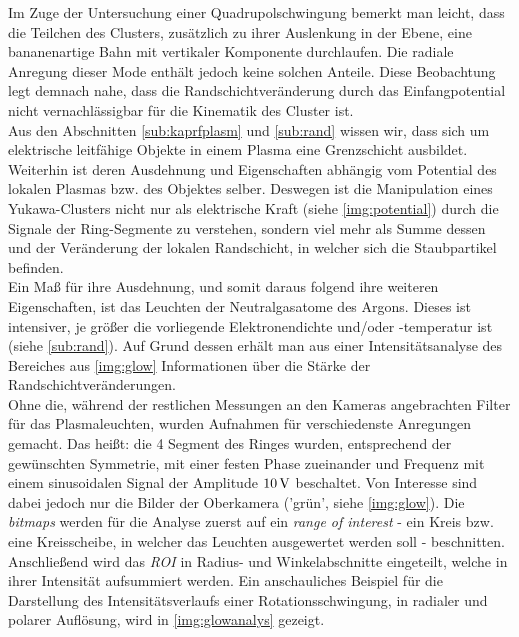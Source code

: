 \documentclass[numbers=noenddot,a4paper]{scrartcl}
\newcommand{\tilt}[1]{\textit{#1}}
\begin{document}
		Im Zuge der Untersuchung einer Quadrupolschwingung bemerkt man leicht, dass die Teilchen des Clusters, zusätzlich zu ihrer Auslenkung in der Ebene, eine bananenartige Bahn mit vertikaler Komponente durchlaufen. Die radiale Anregung dieser Mode enthält jedoch keine solchen Anteile. Diese Beobachtung legt demnach nahe, dass die Randschichtveränderung durch das Einfangpotential nicht vernachlässigbar für die Kinematik des Cluster ist.\\
		Aus den Abschnitten \ref{sub:kaprfplasm} und \ref{sub:rand} wissen wir,  dass sich um elektrische leitfähige Objekte in einem Plasma eine Grenzschicht ausbildet. Weiterhin ist deren Ausdehnung und Eigenschaften abhängig vom Potential des lokalen Plasmas bzw. des Objektes selber. Deswegen ist die Manipulation eines Yukawa-Clusters nicht nur als elektrische Kraft (siehe \ref{img:potential}) durch die Signale der Ring-Segmente zu verstehen, sondern viel mehr als Summe dessen und der Veränderung der lokalen Randschicht, in welcher sich die Staubpartikel befinden.\\
		Ein Maß für ihre Ausdehnung, und somit daraus folgend ihre weiteren Eigenschaften, ist das Leuchten der Neutralgasatome des Argons. Dieses ist intensiver, je größer die vorliegende Elektronendichte und/oder -temperatur ist (siehe \ref{sub:rand}).  Auf Grund dessen erhält man aus einer Intensitätsanalyse des Bereiches aus \ref{img:glow} Informationen über die Stärke der Randschichtveränderungen.\\
        Ohne die, während der restlichen Messungen an den Kameras angebrachten Filter für das Plasmaleuchten, wurden Aufnahmen für verschiedenste Anregungen gemacht. Das heißt: die 4 Segment des Ringes wurden, entsprechend der gewünschten Symmetrie, mit einer festen Phase zueinander und Frequenz mit einem sinusoidalen Signal der Amplitude $\unit[10]{V}$ beschaltet. Von Interesse sind dabei jedoch nur die Bilder der Oberkamera ('grün', siehe \ref{img:glow}). Die \tilt{bitmaps} werden für die Analyse zuerst auf ein \tilt{range of interest} - ein Kreis bzw. eine Kreisscheibe, in welcher das Leuchten ausgewertet werden soll - beschnitten. Anschließend wird das \tilt{ROI} in Radius- und Winkelabschnitte eingeteilt, welche in ihrer Intensität aufsummiert werden. Ein anschauliches Beispiel für die Darstellung des Intensitätsverlaufs einer Rotationsschwingung, in radialer und polarer Auflösung, wird in \ref{img:glowanalys} gezeigt.
\end{document}
